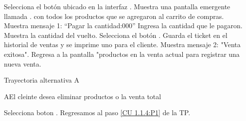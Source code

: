 \begin{UCtrayectoria}
		
	\UCpaso [\UCactor]Selecciona el botón  ubicado en la interfaz .
	\UCpaso [\UCsist]Muestra una pantalla emergente llamada . con todos los productos que se agregaron al carrito de compras.
	\UCpaso [\UCsist]Muestra mensaje 1: “Pagar la cantidad:000”
	\UCpaso [\UCactor]Ingresa la cantidad que le pagaron.
	\UCpaso [\UCsist]Muestra la cantidad del vuelto. 
	\UCpaso [\UCactor]Selecciona el botón . 
	\UCpaso [\UCsist]Guarda el ticket en el historial de ventas y se imprime uno para el cliente.
	\UCpaso [\UCsist]Muestra mensaje 2: "Venta exitosa".
	\UCpaso [\UCsist]Regresa a la pantalla "productos en la venta actual para registrar una nueva venta.
\end{UCtrayectoria}


Trayectoria alternativa A

\begin{UCtrayectoriaA}{A}{El cleinte desea eliminar productos o la venta total}

	\UCpaso [\UCactor] Selecciona boton .	
	\UCpaso [\UCsist]Regresamos al paso \ref{CU 1.1.4:P1} de la TP.
\end{UCtrayectoriaA}



